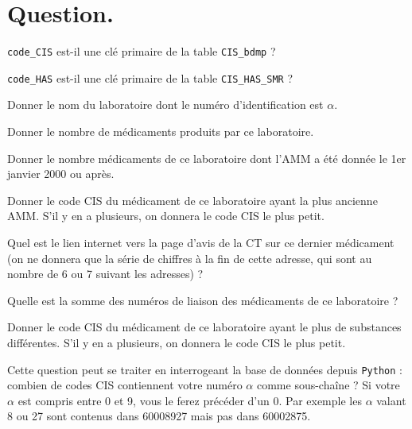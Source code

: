\section*{Question.}

\question{} \texttt{code\_CIS} est-il une clé primaire de la table \texttt{CIS\_bdmp} ?

\medskip

\question{} \texttt{code\_HAS} est-il une clé primaire de la table \texttt{CIS\_HAS\_SMR} ?

\medskip

\question{} Donner le nom du laboratoire dont le numéro d'identification est $\alpha$.

\medskip

\question{} Donner le nombre de médicaments produits par ce laboratoire.

\medskip 

\question{} Donner le nombre médicaments de ce laboratoire dont l'AMM a été donnée le 1er janvier 2000 ou après.

\medskip 

\question{} Donner le code CIS du médicament de ce laboratoire ayant la plus ancienne AMM. S'il y en a plusieurs, on 
donnera le code CIS le plus petit.


\medskip

\question{}  Quel est le lien internet vers la page d'avis de la CT sur ce dernier médicament (on ne donnera que la série de chiffres à la fin de cette adresse, qui sont au nombre de 6 ou 7 suivant les adresses) ?


\medskip

\question{} Quelle est la somme des numéros de liaison des médicaments de ce laboratoire ?

\medskip

\question{} Donner le code CIS du médicament de ce laboratoire ayant le plus de substances différentes. S'il y en a plusieurs, on donnera le code CIS le plus petit.

\medskip

\question{}  Cette question peut se traiter en interrogeant la base de données depuis \texttt{Python} : combien de codes CIS 
contiennent votre numéro $\alpha$ comme sous-chaîne ? Si votre $\alpha$ est compris entre 0 et 9, vous le ferez 
précéder d'un 0. Par exemple les $\alpha$ valant 8 ou 27 sont contenus dans 60008927 mais pas dans 60002875.